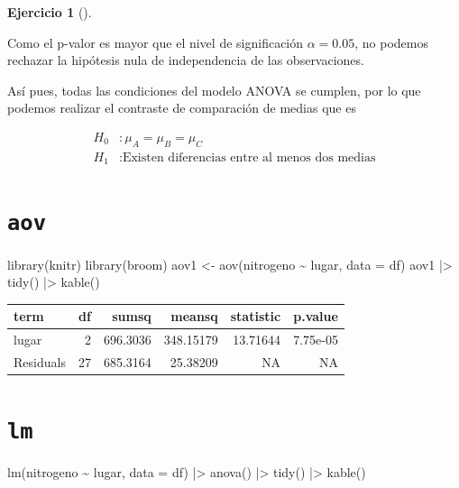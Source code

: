 \documentclass[
  a4paper,
]{scrreport}
\newenvironment{Shaded}{\begin{snugshade}}{\end{snugshade}}
\newcommand{\AttributeTok}[1]{\textcolor[rgb]{0.40,0.45,0.13}{#1}}
\newcommand{\FunctionTok}[1]{\textcolor[rgb]{0.28,0.35,0.67}{#1}}
\newcommand{\NormalTok}[1]{\textcolor[rgb]{0.00,0.23,0.31}{#1}}
\newcommand{\OtherTok}[1]{\textcolor[rgb]{0.00,0.23,0.31}{#1}}
\newcommand{\SpecialCharTok}[1]{\textcolor[rgb]{0.37,0.37,0.37}{#1}}
\theoremstyle{definition}
\newtheorem{exercise}{Ejercicio}[chapter]
\theoremstyle{remark}
\begin{document}
\begin{exercise}[]
\begin{enumerate}
\begin{tcolorbox}
  Como el p-valor es mayor que el nivel de significación
  \(\alpha=0.05\), no podemos rechazar la hipótesis nula de
  independencia de las observaciones.

  Así pues, todas las condiciones del modelo ANOVA se cumplen, por lo
  que podemos realizar el contraste de comparación de medias que es

  \begin{align*}
  H_0 &: \mu_A = \mu_B = \mu_C \\
  H_1 &: \mbox{Existen diferencias entre al menos dos medias}
  \end{align*}

  \section{\texorpdfstring{\texttt{aov}}{aov}}

\begin{Shaded}
\begin{Highlighting}[]
\FunctionTok{library}\NormalTok{(knitr)}
\FunctionTok{library}\NormalTok{(broom)}
\NormalTok{aov1 }\OtherTok{\textless{}{-}} \FunctionTok{aov}\NormalTok{(nitrogeno }\SpecialCharTok{\textasciitilde{}}\NormalTok{ lugar, }\AttributeTok{data =}\NormalTok{ df) }
\NormalTok{aov1 }\SpecialCharTok{|\textgreater{}} 
    \FunctionTok{tidy}\NormalTok{() }\SpecialCharTok{|\textgreater{}} 
    \FunctionTok{kable}\NormalTok{()}
\end{Highlighting}
\end{Shaded}

  \begin{longtable}[]{@{}lrrrrr@{}}
  \toprule\noalign{}
  term & df & sumsq & meansq & statistic & p.value \\
  \midrule\noalign{}
  \endhead
  \bottomrule\noalign{}
  \endlastfoot
  lugar & 2 & 696.3036 & 348.15179 & 13.71644 & 7.75e-05 \\
  Residuals & 27 & 685.3164 & 25.38209 & NA & NA \\
  \end{longtable}

  \section{\texorpdfstring{\texttt{lm}}{lm}}

\begin{Shaded}
\begin{Highlighting}[]
\FunctionTok{lm}\NormalTok{(nitrogeno }\SpecialCharTok{\textasciitilde{}}\NormalTok{ lugar, }\AttributeTok{data =}\NormalTok{ df) }\SpecialCharTok{|\textgreater{}} 
    \FunctionTok{anova}\NormalTok{() }\SpecialCharTok{|\textgreater{}} 
    \FunctionTok{tidy}\NormalTok{() }\SpecialCharTok{|\textgreater{}} 
    \FunctionTok{kable}\NormalTok{()}
\end{Highlighting}
\end{Shaded}


\end{tcolorbox}
\end{enumerate}
\end{exercise}
\end{document}

